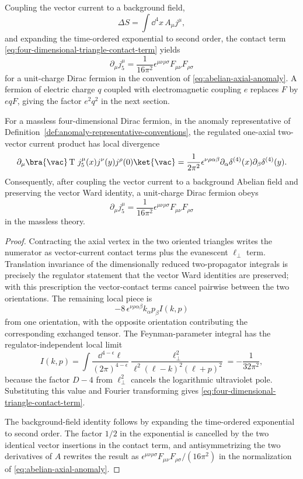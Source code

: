 Coupling the vector current to a background field,
\[
  \Delta S=\int\dd^4x\,A_\mu j^\mu,
\]
and expanding the time-ordered exponential to second order, the contact term
\eqref{eq:four-dimensional-triangle-contact-term} yields
\[
  \partial_\mu j_5^\mu
  =
  \frac1{16\pi^2}
  \epsilon^{\mu\nu\rho\sigma}F_{\mu\nu}F_{\rho\sigma}
\]
for a unit-charge Dirac fermion in the convention of
\eqref{eq:abelian-axial-anomaly}.  A fermion of electric charge \(q\) coupled
with electromagnetic coupling \(e\) replaces \(F\) by \(eqF\), giving the
factor \(e^2q^2\) in the next section.

\begin{proposition}
\label{prop:four-dimensional-axial-contact-term}
For a massless four-dimensional Dirac fermion, in the anomaly representative
of Definition~\ref{def:anomaly-representative-conventions}, the regulated
one-axial two-vector current product has local divergence
\[
  \partial_\mu
  \bra{\vac}
  \operatorname T\,j_5^\mu(x)j^\nu(y)j^\rho(0)
  \ket{\vac}
  =
  \frac1{2\pi^2}
  \epsilon^{\nu\rho\alpha\beta}
  \partial_\alpha\delta^{(4)}(x)
  \partial_\beta\delta^{(4)}(y).
\]
Consequently, after coupling the vector current to a background Abelian field
and preserving the vector Ward identity, a unit-charge Dirac fermion obeys
\[
  \partial_\mu j_5^\mu
  =
  \frac1{16\pi^2}
  \epsilon^{\mu\nu\rho\sigma}F_{\mu\nu}F_{\rho\sigma}
\]
in the massless theory.
\end{proposition}

\begin{proof}
Contracting the axial vertex in the two oriented triangles writes the
numerator as vector-current contact terms plus the evanescent
\(\ell_\perp\) term.  Translation invariance of the dimensionally reduced
two-propagator integrals is precisely the regulator statement that the vector
Ward identities are preserved; with this prescription the vector-contact
terms cancel pairwise between the two orientations.  The remaining local
piece is
\[
  -8\,\epsilon^{\nu\rho\alpha\beta}k_\alpha p_\beta I(k,p)
\]
from one orientation, with the opposite orientation contributing the
corresponding exchanged tensor.  The Feynman-parameter integral has the
regulator-independent local limit
\[
  I(k,p)
  =
  \int\frac{\dd^{4-\epsilon}\ell}{(2\pi)^{4-\epsilon}}
  \frac{\ell_\perp^2}{\ell^2(\ell-k)^2(\ell+p)^2}
  =
  -\frac1{32\pi^2},
\]
because the factor \(D-4\) from \(\ell_\perp^2\) cancels the logarithmic
ultraviolet pole.  Substituting this value and Fourier transforming gives
\eqref{eq:four-dimensional-triangle-contact-term}.

The background-field identity follows by expanding the time-ordered
exponential to second order.  The factor \(1/2\) in the exponential is
cancelled by the two identical vector insertions in the contact term, and
antisymmetrizing the two derivatives of \(A\) rewrites the result as
\(\epsilon^{\mu\nu\rho\sigma}F_{\mu\nu}F_{\rho\sigma}/(16\pi^2)\) in the
normalization of \eqref{eq:abelian-axial-anomaly}.
\end{proof}

